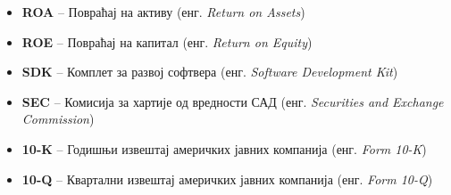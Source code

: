 \begin{itemize}
    \item \textbf{ROA} -- Повраћај на активу (енг. \textit{Return on Assets})
    \item \textbf{ROE} -- Повраћај на капитал (енг. \textit{Return on Equity})
    \item \textbf{SDK} -- Комплет за развој софтвера (енг. \textit{Software Development Kit})
    \item \textbf{SEC} -- Комисија за хартије од вредности САД (енг. \textit{Securities and Exchange Commission})
    \item \textbf{10-K} -- Годишњи извештај америчких јавних компанија (енг. \textit{Form 10-K})
    \item \textbf{10-Q} -- Квартални извештај америчких јавних компанија (енг. \textit{Form 10-Q})
\end{itemize}

\cleardoublepage
{}
{}
\listoftables

\cleardoublepage
{}
{}
\listoffigures

